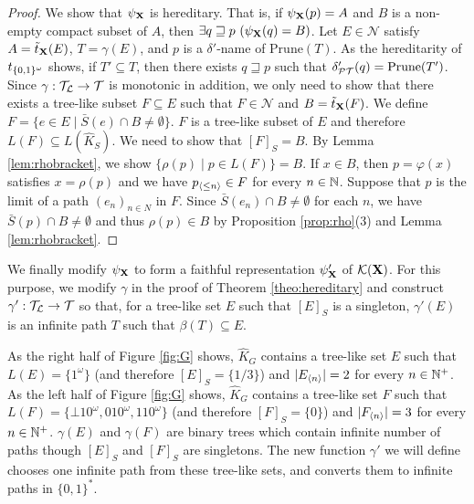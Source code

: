 \documentclass{eptcs-modified}
\begin{document}
\begin{theorem}
\begin{proof}
We show that $\psi_{\mathbf{X}}$ is hereditary. That is, if
$\psi_{\mathbf{X}}(p) = A$ and $B$ is a non-empty compact subset of $A$,
then $\exists q \sqsupseteq p\  (\psi_{\mathbf{X}}(q) = B)$.
Let $E \in \mathcal{N}$ satisfy $A = \tilde{t}_{\mathbf{X}}(E)$,
$T = \gamma(E)$, and $p$ is a $\delta'$-name of  $\textrm{Prune} (T)$.
As the hereditarity of $t_{\{0,1\}^\omega}$ shows,
if $T' \subseteq T$, then there exists $q \sqsupseteq p$ such that
$\delta'_{\mathcal{PT}}(q) = \textrm{Prune}(T')$.
Since $\gamma : \mathcal{T}_\mathcal{L} \to \mathcal{T}$ is monotonic in addition, we only need to show that
there exists a tree-like subset $F \subseteq E$ such that $F \in \mathcal{N}$ and $B = \tilde{t}_{\mathbf{X}}(F)$.
We define $F = \{e \in E \mid \bar{S}(e) \cap B \ne \emptyset\}$.
$F$ is a tree-like subset of $E$ and therefore $L(F) \subseteq L(\widehat{K}_S)$.
We need to show that $[F]_S= B$.
By Lemma \ref{lem:rhobracket}, we show
$\{\rho(p) \mid p \in L(F)\} = B$.
If $x \in B$, then $p = \varphi(x)$ satisfies $x = \rho(p)$ and we have ${{p_{{\langle\leq n\rangle}}}} \in F$ for every $n \in \mathbb{N}$.
Suppose that $p$ is the limit of a path $(e_n)_{n \in N}$ in $F$. Since $\bar{S}(e_n) \cap B \ne \emptyset$ for each $n$,
we have $\bar{S}(p) \cap B \ne \emptyset$ and thus $\rho(p) \in B$ by Proposition \ref{prop:rho}(3) and
Lemma \ref{lem:rhobracket}.
\end{proof}
\end{theorem}

We finally modify $\psi_{\mathbf{X}}$ to form a faithful representation $\psi'_{\mathbf{X}}$ of $\mathcal{K}(\mathbf{X})$.
For this purpose,
we modify $\gamma$ in the proof of Theorem \ref{theo:hereditary}
and construct $\gamma' : \mathcal{T}_\mathcal{L} \to \mathcal{T}$
so that, for a tree-like set $E$ such that $[E]_S$ is a singleton,
$\gamma'(E)$ is an infinite path $T$ such that $\beta(T) \subseteq E$.

\begin{example}
  As the right half of Figure \ref{fig:G} shows, $\widehat{K}_G$ contains a tree-like set $E$ such that
$L(E) = \{1^\omega\}$ (and therefore $[E]_S = \{1/3\}$)  and $|{{{E}_{{\langle n\rangle}}}}| = 2$ for every $n \in \mathbb{N}^+$.
 As the left half of Figure \ref{fig:G} shows, $\widehat{K}_G$ contains a tree-like set $F$ such that
$L(F) = \{\bot 1 0^\omega, 0 1 0^\omega, 1 1 0^\omega \}$ (and therefore $[F]_S = \{0\}$)  and $|{{{F}_{{\langle n\rangle}}}}| = 3$ for every $n \in \mathbb{N}^+$.
$\gamma(E)$ and $\gamma(F)$ are binary trees which contain infinite number of paths
though $[E]_S$ and $[F]_S$ are singletons.
The new function $\gamma'$ we will define chooses one infinite path from these tree-like sets, and converts them to infinite paths in $\{0,1\}^*$.
\end{example}
\end{document}
